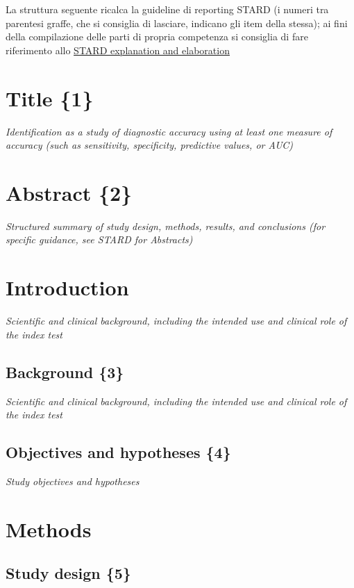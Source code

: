 
La struttura seguente ricalca la guideline di reporting STARD (i
numeri tra parentesi graffe, che si consiglia di lasciare, indicano
gli item della stessa); ai fini della compilazione delle parti di
propria competenza si consiglia di fare riferimento allo
\href{https://www.ncbi.nlm.nih.gov/pmc/articles/pmid/28137831/}{STARD
  explanation and elaboration}

\section{Title \{1\}}

{\em Identification as a study of diagnostic accuracy using at least one
measure of accuracy (such as sensitivity, specificity, predictive
values, or AUC)}

\section{Abstract \{2\}}

{\em Structured summary of study design, methods, results, and conclusions
(for specific guidance, see STARD for Abstracts)}

\section{Introduction}

{\em Scientific and clinical background, including the intended use and
clinical role of the index test}

\subsection{Background \{3\}}

{\em Scientific and clinical background, including the intended use and
clinical role of the index test}

\subsection{Objectives and hypotheses \{4\}}

{\em Study objectives and hypotheses}

\section{Methods}

\subsection{Study design \{5\}}

